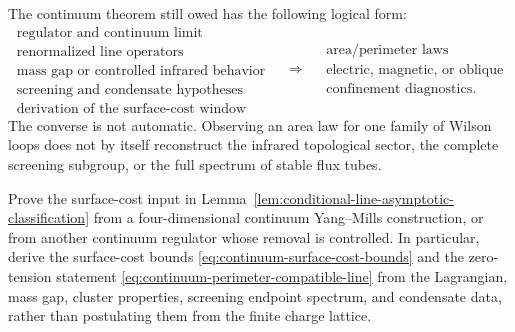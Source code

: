 The continuum theorem still owed has the following logical form:
\[
\begin{array}{c}
\text{regulator and continuum limit}\\
\text{renormalized line operators}\\
\text{mass gap or controlled infrared behavior}\\
\text{screening and condensate hypotheses}\\
\text{derivation of the surface-cost window}
\end{array}
\quad\Longrightarrow\quad
\begin{array}{c}
\text{area/perimeter laws}\\
\text{electric, magnetic, or oblique}\\
\text{confinement diagnostics}.
\end{array}
\]
The converse is not automatic.  Observing an area law for one family of
Wilson loops does not by itself reconstruct the infrared topological sector,
the complete screening subgroup, or the full spectrum of stable flux tubes.

\begin{openproblem}
\label{op:continuum-confinement-criterion}
Prove the surface-cost input in
Lemma~\ref{lem:conditional-line-asymptotic-classification} from a
four-dimensional continuum Yang--Mills construction, or from another continuum
regulator whose removal is controlled.  In particular, derive the surface-cost
bounds
\eqref{eq:continuum-surface-cost-bounds} and the zero-tension statement
\eqref{eq:continuum-perimeter-compatible-line} from the Lagrangian, mass gap,
cluster properties, screening endpoint spectrum, and condensate data, rather
than postulating them from the finite charge lattice.
\end{openproblem}
